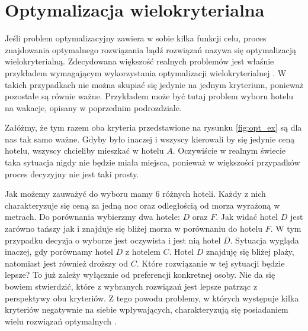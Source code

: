 \documentclass[twoside]{iisthesis}
\begin{document}
\section{Optymalizacja wielokryterialna}
Jeśli problem optymalizacyjny zawiera w sobie kilka funkcji celu, proces znajdowania optymalnego rozwiązania bądź rozwiązań nazywa się optymalizacją wielokryterialną. Zdecydowana większość realnych problemów jest właśnie przykładem wymagającym wykorzystania optymalizacji wielokryterialnej \cite{book}. W takich przypadkach nie można skupiać się jedynie na jednym kryterium, ponieważ pozostałe są równie ważne. Przykładem może być tutaj problem wyboru hotelu na wakacje, opisany w poprzednim podrozdziale. 

Załóżmy, że tym razem oba kryteria przedstawione na rysunku \eqref{fig:opt_ex} są dla nas tak samo ważne. Gdyby było inaczej i wszyscy kierowali by się jedynie ceną hotelu, wszyscy chcieliby mieszkać w hotelu $A$. Oczywiście w realnym świecie taka sytuacja nigdy nie będzie miała miejsca, ponieważ w większości przypadków proces decyzyjny nie jest taki prosty.

Jak możemy zauważyć do wyboru mamy 6 różnych hoteli. Każdy z nich charakteryzuje się ceną za jedną noc oraz odległością od morza wyrażoną w metrach. Do porównania wybierzmy dwa hotele: $D$ oraz $F$. Jak widać hotel $D$ jest zarówno tańszy jak i znajduje się bliżej morza w porównaniu do hotelu $F$. W tym przypadku decyzja o wyborze jest oczywista i jest nią hotel $D$. Sytuacja wygląda inaczej, gdy porównamy hotel $D$ z hotelem $C$. Hotel $D$ znajduję się bliżej plaży, natomiast jest również droższy od $C$. Które rozwiązanie w tej sytuacji będzie lepsze? To już zależy wyłącznie od preferencji konkretnej osoby. Nie da się bowiem stwierdzić, które z wybranych rozwiązań jest lepsze patrząc z perspektywy obu kryteriów. Z tego powodu problemy, w których występuje kilka kryteriów negatywnie na siebie wpływających, charakteryzują się posiadaniem wielu rozwiązań optymalnych \cite{book_ergot}.
\end{document}
